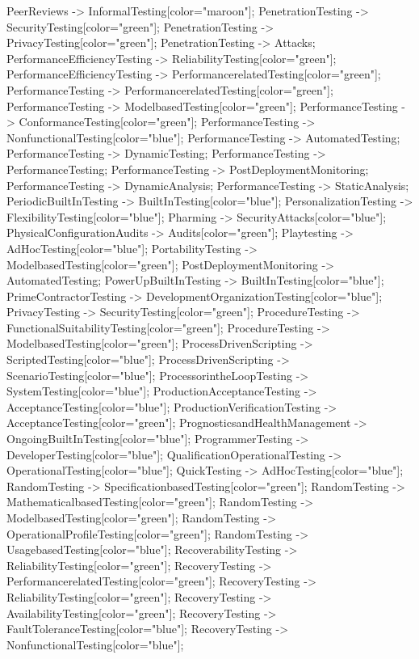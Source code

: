 \documentclass{article}
\begin{document}
{PeerReviews -> InformalTesting[color="maroon"];
PenetrationTesting -> SecurityTesting[color="green"];
PenetrationTesting -> PrivacyTesting[color="green"];
PenetrationTesting -> Attacks;
PerformanceEfficiencyTesting -> ReliabilityTesting[color="green"];
PerformanceEfficiencyTesting -> PerformancerelatedTesting[color="green"];
PerformanceTesting -> PerformancerelatedTesting[color="green"];
PerformanceTesting -> ModelbasedTesting[color="green"];
PerformanceTesting -> ConformanceTesting[color="green"];
PerformanceTesting -> NonfunctionalTesting[color="blue"];
PerformanceTesting -> AutomatedTesting;
PerformanceTesting -> DynamicTesting;
PerformanceTesting -> PerformanceTesting;
PerformanceTesting -> PostDeploymentMonitoring;
PerformanceTesting -> DynamicAnalysis;
PerformanceTesting -> StaticAnalysis;
PeriodicBuiltInTesting -> BuiltInTesting[color="blue"];
PersonalizationTesting -> FlexibilityTesting[color="blue"];
Pharming -> SecurityAttacks[color="blue"];
PhysicalConfigurationAudits -> Audits[color="green"];
Playtesting -> AdHocTesting[color="blue"];
PortabilityTesting -> ModelbasedTesting[color="green"];
PostDeploymentMonitoring -> AutomatedTesting;
PowerUpBuiltInTesting -> BuiltInTesting[color="blue"];
PrimeContractorTesting -> DevelopmentOrganizationTesting[color="blue"];
PrivacyTesting -> SecurityTesting[color="green"];
ProcedureTesting -> FunctionalSuitabilityTesting[color="green"];
ProcedureTesting -> ModelbasedTesting[color="green"];
ProcessDrivenScripting -> ScriptedTesting[color="blue"];
ProcessDrivenScripting -> ScenarioTesting[color="blue"];
ProcessorintheLoopTesting -> SystemTesting[color="blue"];
ProductionAcceptanceTesting -> AcceptanceTesting[color="blue"];
ProductionVerificationTesting -> AcceptanceTesting[color="green"];
PrognosticsandHealthManagement -> OngoingBuiltInTesting[color="blue"];
ProgrammerTesting -> DeveloperTesting[color="blue"];
QualificationOperationalTesting -> OperationalTesting[color="blue"];
QuickTesting -> AdHocTesting[color="blue"];
RandomTesting -> SpecificationbasedTesting[color="green"];
RandomTesting -> MathematicalbasedTesting[color="green"];
RandomTesting -> ModelbasedTesting[color="green"];
RandomTesting -> OperationalProfileTesting[color="green"];
RandomTesting -> UsagebasedTesting[color="blue"];
RecoverabilityTesting -> ReliabilityTesting[color="green"];
RecoveryTesting -> PerformancerelatedTesting[color="green"];
RecoveryTesting -> ReliabilityTesting[color="green"];
RecoveryTesting -> AvailabilityTesting[color="green"];
RecoveryTesting -> FaultToleranceTesting[color="blue"];
RecoveryTesting -> NonfunctionalTesting[color="blue"];
}
\end{document}
